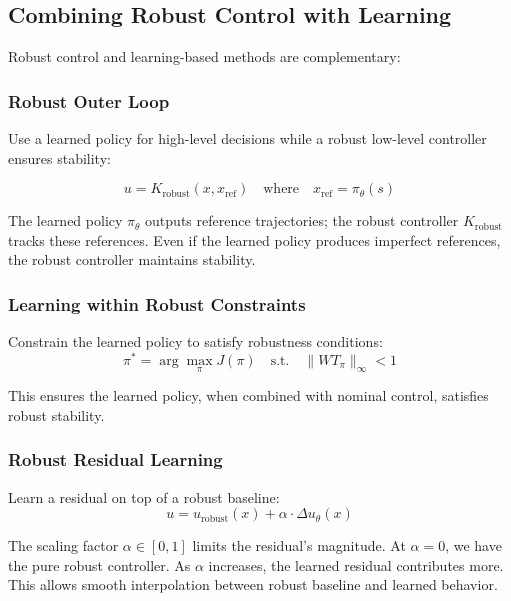 \subsection{Combining Robust Control with Learning}

Robust control and learning-based methods are complementary:

\subsubsection{Robust Outer Loop}

Use a learned policy for high-level decisions while a robust low-level controller ensures stability:

\begin{equation}
u = K_{\text{robust}}(x, x_{\text{ref}}) \quad \text{where} \quad x_{\text{ref}} = \pi_\theta(s)
\end{equation}

The learned policy $\pi_\theta$ outputs reference trajectories; the robust controller $K_{\text{robust}}$ tracks these references. Even if the learned policy produces imperfect references, the robust controller maintains stability.

\subsubsection{Learning within Robust Constraints}

Constrain the learned policy to satisfy robustness conditions:
\begin{equation}
\pi^* = \arg\max_\pi J(\pi) \quad \text{s.t.} \quad \|W T_\pi\|_\infty < 1
\end{equation}

This ensures the learned policy, when combined with nominal control, satisfies robust stability.

\subsubsection{Robust Residual Learning}

Learn a residual on top of a robust baseline:
\begin{equation}
u = u_{\text{robust}}(x) + \alpha \cdot \Delta u_\theta(x)
\label{eq:robust_residual}
\end{equation}

The scaling factor $\alpha \in [0, 1]$ limits the residual's magnitude. At $\alpha = 0$, we have the pure robust controller. As $\alpha$ increases, the learned residual contributes more. This allows smooth interpolation between robust baseline and learned behavior.

